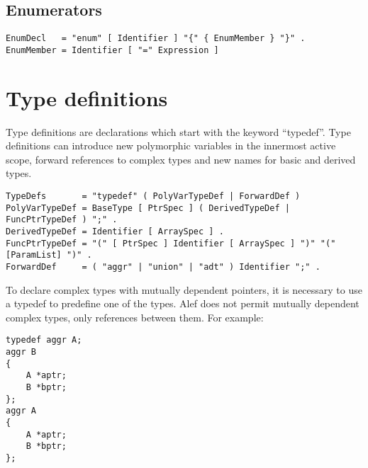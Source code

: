 \hypertarget{enumerators}{%
\subsection{Enumerators}\label{enumerators}}

\begin{lstlisting}
EnumDecl   = "enum" [ Identifier ] "{" { EnumMember } "}" .
EnumMember = Identifier [ "=" Expression ]
\end{lstlisting}

\hypertarget{type-definitions}{%
\section{Type definitions}\label{type-definitions}}

Type definitions are declarations which start with the keyword
``typedef''. Type definitions can introduce new polymorphic variables in
the innermost active scope, forward references to complex types and new
names for basic and derived types.

\begin{lstlisting}
TypeDefs       = "typedef" ( PolyVarTypeDef | ForwardDef )
PolyVarTypeDef = BaseType [ PtrSpec ] ( DerivedTypeDef | FuncPtrTypeDef ) ";" .
DerivedTypeDef = Identifier [ ArraySpec ] .
FuncPtrTypeDef = "(" [ PtrSpec ] Identifier [ ArraySpec ] ")" "(" [ParamList] ")" .
ForwardDef     = ( "aggr" | "union" | "adt" ) Identifier ";" .
\end{lstlisting}

To declare complex types with mutually dependent pointers, it is
necessary to use a typedef to predefine one of the types. Alef does not
permit mutually dependent complex types, only references between them.
For example:

\begin{lstlisting}
typedef aggr A;
aggr B
{
    A *aptr;
    B *bptr;
};
aggr A
{
    A *aptr;
    B *bptr;
};
\end{lstlisting}

